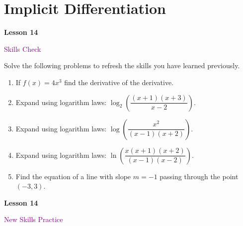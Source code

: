 \documentclass[10pt]{book}
\theoremstyle{definition}
\theoremstyle{remark}
\begin{document}
\section{Implicit Differentiation}
\begin{tcolorbox}[
  width=\textwidth,
  colback=gray!10, %
  colframe=white, %
  boxrule=0pt,    %
  left=1cm,       %
  right=1cm,      %
  sharp corners  %
]

\begin{minipage}[t]{0.5\textwidth}
  \Huge \textbf{Lesson 14}
\end{minipage}%
\hfill
\begin{minipage}[t]{0.5\textwidth}
  \Huge \textcolor{purple}{Skills Check}
\end{minipage}
\end{tcolorbox}

\begin{large}
\noindent
Solve the following problems to refresh the skills you have learned previously.
\begin{enumerate}
\item If $f(x)=4x^{3}$ find the derivative of the derivative. \vfil \vfil \vfil
\item Expand using logarithm laws: $\log_{2}\left( \dfrac{(x+1)(x+3)}{x-2} \right)$.\vfil \vfil \vfil
\item Expand using logarithm laws: $\log\left( \dfrac{x^{2}}{(x-1)(x+2)} \right)$.\vfil \vfil\vfil
\item Expand using logarithm laws: $\ln\left( \dfrac{x(x+1)(x+2)}{(x-1)(x-2)} \right)$.\vfil \vfil \vfil
\item Find the equation of a line with slope $m=-1$ passing through the point $(-3,3)$.\vfil \vfil
\end{enumerate}
\end{large}
\newpage


\begin{tcolorbox}[
  width=\textwidth,
  colback=gray!10, %
  colframe=white, %
  boxrule=0pt,    %
  left=1cm,       %
  right=1cm,      %
  sharp corners  %
]

\begin{minipage}[t]{0.5\textwidth}
  \Huge \textbf{Lesson 14}
\end{minipage}%
\hfill
\begin{minipage}[t]{0.5\textwidth}
  \Huge\textcolor{purple}{New Skills Practice}
\end{minipage}
\end{tcolorbox}
\end{document}
